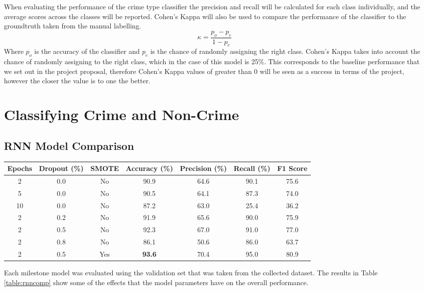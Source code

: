 \documentclass[12pt,a4paper,twoside,openright]{report}
\begin{document}
\noindent
When evaluating the performance of the crime type classifier the precision and recall will be calculated for each class individually, and the average scores across the classes will be reported. Cohen's Kappa \cite{cohen1960coefficient} will also be used to compare the performance of the classifier to the groundtruth taken from the manual labelling. 
\begin{equation}
    \kappa = \frac{p_o - p_e}{1 - p_e}
\end{equation}
Where $p_o$ is the accuracy of the classifier and $p_e$ is the chance of randomly assigning the right class. Cohen's Kappa takes into account the chance of randomly assigning to the right class, which in the case of this model is 25\%. This corresponds to the baseline performance that we set out in the project proposal, therefore Cohen's Kappa values of greater than 0 will be seen as a success in terms of the project, however the closer the value is to one the better. 

\section{Classifying Crime and Non-Crime}
\label{section:rnncomp}
\subsection{RNN Model Comparison}

\begin{table*}[h]
\centering
\begin{tabular}{|c|c|c|c|c|c|c|}
\hline
Epochs & Dropout (\%) & SMOTE & Accuracy (\%) & Precision (\%) & Recall (\%) & F1 Score\\ \hline \hline
2 & 0.0 & No & 90.9 & 64.6 & 90.1 & 75.6 \\ \hline
5 & 0.0 & No & 90.5 & 64.1 & 87.3 & 74.0 \\ \hline
10 & 0.0 & No & 87.2 & 63.0 & 25.4 & 36.2 \\ \hline
2 & 0.2 & No & 91.9  & 65.6 & 90.0 & 75.9\\ \hline
2 & 0.5 & No & 92.3 & 67.0 & 91.0 & 77.0\\ \hline
2 & 0.8 & No & 86.1 & 50.6 & 86.0 & 63.7 \\ \hline
2 & 0.5 & Yes & \textbf{93.6} & 70.4 & 95.0 & 80.9\\ \hline
\end{tabular}
\caption{Parameters and metrics for milestone RNN models, calculated as an average over 10 rounds of repeated random sub-sampling  validation} 
\label{table:rnncomp}
\end{table*}
Each milestone model was evaluated using the validation set that was taken from the collected dataset. The results in Table \ref{table:rnncomp} show some of the effects that the model parameters have on the overall performance. 
\end{document}

